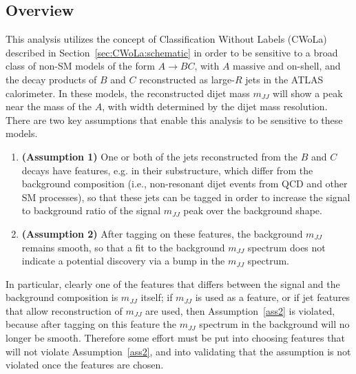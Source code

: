 \subsection{Overview}
\label{sec:CWoLa:Analysis:Overview}
This analysis utilizes the concept of Classification Without Labels (CWoLa) described in Section~\ref{sec:CWoLa:schematic} in order to be sensitive to a broad class of non-SM models of the form $A\rightarrow BC$, with $A$ massive and on-shell, and the decay products of $B$ and $C$ reconstructed as large-$R$ jets in the ATLAS calorimeter.
In these models, the reconstructed dijet mass $m_{JJ}$ will show a peak near the mass of the $A$, with width determined by the dijet mass resolution.
There are two key assumptions that enable this analysis to be sensitive to these models.
\begin{enumerate}
  \item \textbf{(Assumption 1)} One or both of the jets reconstructed from the $B$ and $C$ decays have features, e.g. in their substructure, which differ from the background composition (i.e., non-resonant dijet events from QCD and other SM processes), so that these jets can be tagged in order to increase the signal to background ratio of the signal $m_{JJ}$ peak over the background shape. \label{ass1}
  \item \textbf{(Assumption 2)} After tagging on these features, the background $m_{JJ}$ remains smooth, so that a fit to the background $m_{JJ}$ spectrum does not indicate a potential discovery via a bump in the $m_{JJ}$ spectrum. \label{ass2}
\end{enumerate}
In particular, clearly one of the features that differs between the signal and the background composition is $m_{JJ}$ itself; if $m_{JJ}$ is used as a feature, or if jet features that allow reconstruction of $m_{JJ}$ are used, then Assumption~\ref{ass2} is violated, because after tagging on this feature the $m_{JJ}$ spectrum in the background will no longer be smooth.
Therefore some effort must be put into choosing features that will not violate Assumption~\ref{ass2}, and into validating that the assumption is not violated once the features are chosen.

